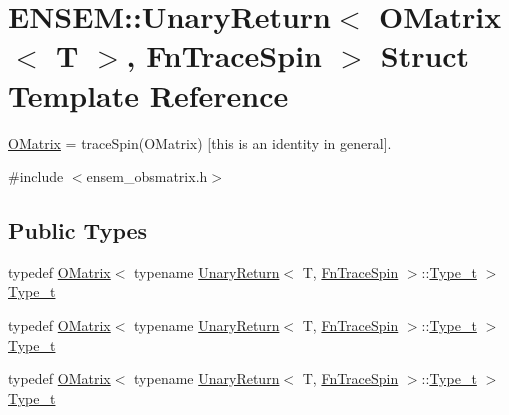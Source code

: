 \hypertarget{structENSEM_1_1UnaryReturn_3_01OMatrix_3_01T_01_4_00_01FnTraceSpin_01_4}{}\section{E\+N\+S\+EM\+:\+:Unary\+Return$<$ O\+Matrix$<$ T $>$, Fn\+Trace\+Spin $>$ Struct Template Reference}
\label{structENSEM_1_1UnaryReturn_3_01OMatrix_3_01T_01_4_00_01FnTraceSpin_01_4}


\mbox{\hyperlink{classENSEM_1_1OMatrix}{O\+Matrix}} = trace\+Spin(\+O\+Matrix) \mbox{[}this is an identity in general\mbox{]}.  




{\ttfamily \#include $<$ensem\+\_\+obsmatrix.\+h$>$}

\subsection*{Public Types}
\begin{DoxyCompactItemize}
\item 
typedef \mbox{\hyperlink{classENSEM_1_1OMatrix}{O\+Matrix}}$<$ typename \mbox{\hyperlink{structENSEM_1_1UnaryReturn}{Unary\+Return}}$<$ T, \mbox{\hyperlink{structENSEM_1_1FnTraceSpin}{Fn\+Trace\+Spin}} $>$\+::\mbox{\hyperlink{structENSEM_1_1UnaryReturn_3_01OMatrix_3_01T_01_4_00_01FnTraceSpin_01_4_a9d6cbecc05de075e41d52fd0b7f2b55e}{Type\+\_\+t}} $>$ \mbox{\hyperlink{structENSEM_1_1UnaryReturn_3_01OMatrix_3_01T_01_4_00_01FnTraceSpin_01_4_a9d6cbecc05de075e41d52fd0b7f2b55e}{Type\+\_\+t}}
\item 
typedef \mbox{\hyperlink{classENSEM_1_1OMatrix}{O\+Matrix}}$<$ typename \mbox{\hyperlink{structENSEM_1_1UnaryReturn}{Unary\+Return}}$<$ T, \mbox{\hyperlink{structENSEM_1_1FnTraceSpin}{Fn\+Trace\+Spin}} $>$\+::\mbox{\hyperlink{structENSEM_1_1UnaryReturn_3_01OMatrix_3_01T_01_4_00_01FnTraceSpin_01_4_a9d6cbecc05de075e41d52fd0b7f2b55e}{Type\+\_\+t}} $>$ \mbox{\hyperlink{structENSEM_1_1UnaryReturn_3_01OMatrix_3_01T_01_4_00_01FnTraceSpin_01_4_a9d6cbecc05de075e41d52fd0b7f2b55e}{Type\+\_\+t}}
\item 
typedef \mbox{\hyperlink{classENSEM_1_1OMatrix}{O\+Matrix}}$<$ typename \mbox{\hyperlink{structENSEM_1_1UnaryReturn}{Unary\+Return}}$<$ T, \mbox{\hyperlink{structENSEM_1_1FnTraceSpin}{Fn\+Trace\+Spin}} $>$\+::\mbox{\hyperlink{structENSEM_1_1UnaryReturn_3_01OMatrix_3_01T_01_4_00_01FnTraceSpin_01_4_a9d6cbecc05de075e41d52fd0b7f2b55e}{Type\+\_\+t}} $>$ \mbox{\hyperlink{structENSEM_1_1UnaryReturn_3_01OMatrix_3_01T_01_4_00_01FnTraceSpin_01_4_a9d6cbecc05de075e41d52fd0b7f2b55e}{Type\+\_\+t}}
\end{DoxyCompactItemize}


